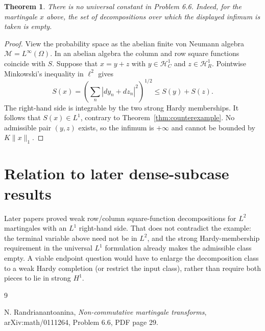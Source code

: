 \documentclass[11pt]{article}
\newtheorem{theorem}{Theorem}
\newcommand{\Hc}{\mathcal H^1_C}
\newcommand{\Hr}{\mathcal H^1_R}
\begin{document}
\begin{theorem}
There is no universal constant in Problem 6.6.  Indeed, for the martingale
$x$ above, the set of decompositions over which the displayed infimum is
taken is empty.
\end{theorem}

\begin{proof}
View the probability space as the abelian finite von Neumann algebra
$\mathcal M=L^\infty(\Omega)$.  In an abelian algebra the column and row
square functions coincide with $S$.  Suppose that
$x=y+z$ with $y\in\Hc$ and $z\in\Hr$.  Pointwise Minkowski's inequality
in $\ell^2$ gives
\[
 S(x)=\left(\sum_n|dy_n+dz_n|^2\right)^{1/2}
 \le S(y)+S(z).
\]
The right-hand side is integrable by the two strong Hardy memberships.
It follows that $S(x)\in L^1$, contrary to
Theorem~\ref{thm:counterexample}.  No admissible pair $(y,z)$ exists, so
the infimum is $+\infty$ and cannot be bounded by $K\|x\|_1$.
\end{proof}

\section{Relation to later dense-subcase results}

Later papers proved weak row/column square-function decompositions for
$L^2$ martingales with an $L^1$ right-hand side.  That does not contradict
the example: the terminal variable above need not be in $L^2$, and the
strong Hardy-membership requirement in the universal $L^1$ formulation
already makes the admissible class empty.  A viable endpoint question would
have to enlarge the decomposition class to a weak Hardy completion (or
restrict the input class), rather than require both pieces to lie in strong
$H^1$.

\begin{thebibliography}{9}
\raggedright
{}
N. Randrianantoanina,
\emph{Non-commutative martingale transforms},
arXiv:math/0111264, Problem 6.6, PDF page 29.
\end{thebibliography}
\end{document}
